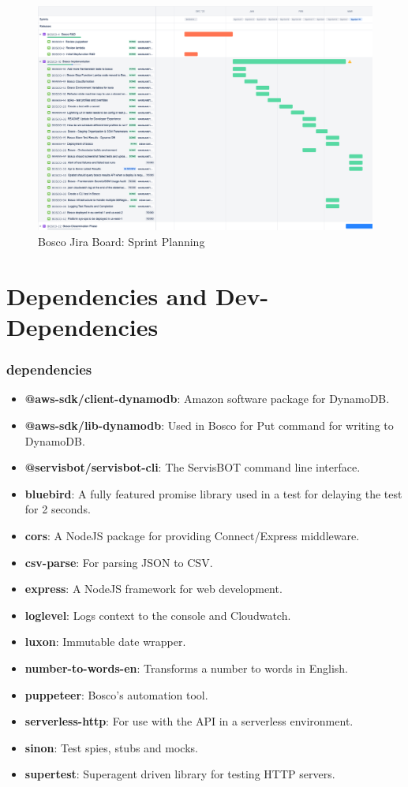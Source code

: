 \documentclass[12pt,a4paper,titlepage]{report}
\begin{document}
\begin{figure}[ht]
 \centering
 \includegraphics[width=15cm]{./diagrams/bosco_board.png}
 \caption{Bosco Jira Board: Sprint Planning}
\end{figure}

\chapter{Dependencies and Dev-Dependencies}
\subsection*{dependencies}
\begin{itemize}
  \item \textbf{@aws-sdk/client-dynamodb}: Amazon software package for DynamoDB.
  \item \textbf{@aws-sdk/lib-dynamodb}: Used in Bosco for Put command for writing to DynamoDB.
  \item \textbf{@servisbot/servisbot-cli}: The ServisBOT command line interface.
  \item \textbf{bluebird}: A fully featured promise library used in a test for delaying the test for 2 seconds.
  \item \textbf{cors}: A NodeJS package for providing Connect/Express middleware.
  \item \textbf{csv-parse}: For parsing JSON to CSV.
  \item \textbf{express}: A NodeJS framework for web development.
  \item \textbf{loglevel}: Logs context to the console and Cloudwatch.
  \item \textbf{luxon}: Immutable date wrapper.
  \item \textbf{number-to-words-en}: Transforms a number to words in English.
  \item \textbf{puppeteer}: Bosco's automation tool.
  \item \textbf{serverless-http}: For use with the API in a serverless environment.
  \item \textbf{sinon}: Test spies, stubs and mocks.
  \item \textbf{supertest}: Superagent driven library for testing HTTP servers.
\end{itemize}
\end{document}
